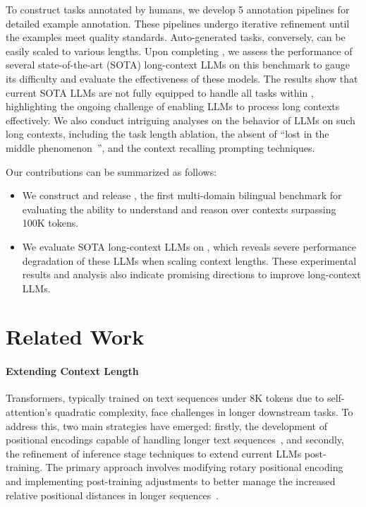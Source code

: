 To construct tasks annotated by humans, we develop 5 annotation pipelines for detailed example annotation. These pipelines undergo iterative refinement until the examples meet quality standards. Auto-generated tasks, conversely, can be easily scaled to various lengths. Upon completing \OURS, we assess the performance of several state-of-the-art (SOTA) long-context LLMs on this benchmark to gauge its difficulty and evaluate the effectiveness of these models. The results show that current SOTA LLMs are not fully equipped to handle all tasks within \OURS, highlighting the ongoing challenge of enabling LLMs to process long contexts effectively. We also conduct intriguing analyses on the behavior of LLMs on such long contexts, including the task length ablation, the absent of ``lost in the middle phenomenon~\cite{lost-in-the-middle}'', and the context recalling prompting techniques.

Our contributions can be summarized as follows:
\begin{itemize}
    \item We construct and release \OURS, the first multi-domain bilingual benchmark for evaluating the ability to understand and reason over contexts surpassing 100K tokens. 
    \item We evaluate SOTA long-context LLMs on \OURS, which reveals severe performance degradation of these LLMs when scaling context lengths. These experimental results and analysis also indicate promising directions to improve long-context LLMs.
\end{itemize}

\section{Related Work}

\paragraph{Extending Context Length}

Transformers, typically trained on text sequences under 8K tokens due to self-attention's quadratic complexity, face challenges in longer downstream tasks. To address this, two main strategies have emerged: firstly, the development of positional encodings capable of handling longer text sequences~\cite{sun2022length, press2021train}, and secondly, the refinement of inference stage techniques to extend current LLMs post-training. The primary approach involves modifying rotary positional encoding~\cite{su2023roformer} and implementing post-training adjustments to better manage the increased relative positional distances in longer sequences~\cite{zhu2023pose, yarn, chen2023extending}.

